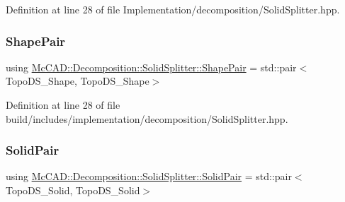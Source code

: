 Definition at line 28 of file Implementation/decomposition/\+Solid\+Splitter.\+hpp.

\mbox{\label{classMcCAD_1_1Decomposition_1_1SolidSplitter_a6d92618f3790cfc7403c6f421bd66411}} 
\subsubsection{\texorpdfstring{Shape\+Pair}{ShapePair}\hspace{0.1cm}{\footnotesize\ttfamily [2/2]}}
{\footnotesize\ttfamily using \hyperlink{classMcCAD_1_1Decomposition_1_1SolidSplitter_a6d92618f3790cfc7403c6f421bd66411}{Mc\+C\+A\+D\+::\+Decomposition\+::\+Solid\+Splitter\+::\+Shape\+Pair} =  std\+::pair$<$Topo\+D\+S\+\_\+\+Shape, Topo\+D\+S\+\_\+\+Shape$>$\hspace{0.3cm}{\ttfamily [private]}}



Definition at line 28 of file build/includes/implementation/decomposition/\+Solid\+Splitter.\+hpp.

\mbox{\label{classMcCAD_1_1Decomposition_1_1SolidSplitter_a89a95e43f161348b456a72c9acce0826}} 
\subsubsection{\texorpdfstring{Solid\+Pair}{SolidPair}\hspace{0.1cm}{\footnotesize\ttfamily [1/2]}}
{\footnotesize\ttfamily using \hyperlink{classMcCAD_1_1Decomposition_1_1SolidSplitter_a89a95e43f161348b456a72c9acce0826}{Mc\+C\+A\+D\+::\+Decomposition\+::\+Solid\+Splitter\+::\+Solid\+Pair} =  std\+::pair$<$Topo\+D\+S\+\_\+\+Solid, Topo\+D\+S\+\_\+\+Solid$>$\hspace{0.3cm}{\ttfamily [private]}}



